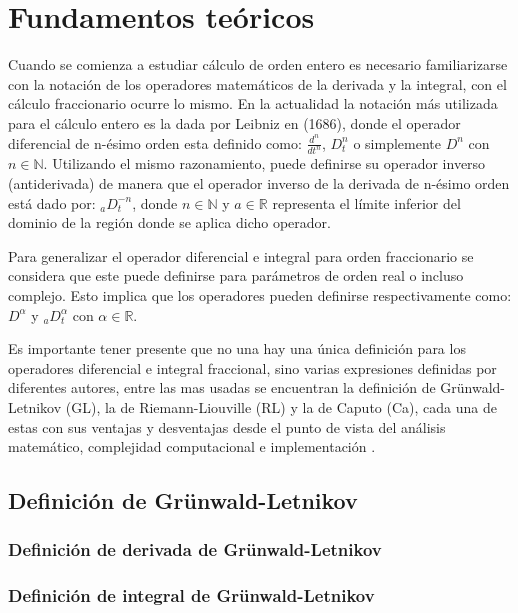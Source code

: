 \chapter{Fundamentos teóricos}		
	Cuando se comienza a estudiar cálculo de orden entero es necesario familiarizarse con la notación de los operadores matemáticos de la derivada y la integral, con el cálculo fraccionario ocurre lo mismo. En la actualidad la notación más utilizada para el cálculo entero es la dada por Leibniz en (1686), donde el operador diferencial de n-ésimo orden esta definido como: $\frac{d^{n}}{dt^{n}}$, $D_{t}^{n}$ o simplemente $D^{n}$ con $n \in \mathbb{N}$. Utilizando el mismo razonamiento, puede definirse su operador inverso (antiderivada) de manera que el operador inverso de la derivada de n-ésimo orden está dado por: $_{a}D^{-n}_{t}$, donde $n \in \mathbb{N}$ y $a \in \mathbb{R}$ representa el límite inferior del dominio de la región donde se aplica dicho operador.
			
	Para generalizar el operador diferencial e integral para orden fraccionario se considera que este puede definirse para parámetros de orden real o incluso complejo. Esto implica que los operadores pueden definirse respectivamente como: $D^{\alpha}$ y $_{a}D^{\alpha}_{t}$ con $ \alpha \in \mathbb{R}$. 
		
	Es importante tener presente que no una hay una única definición para los operadores diferencial e integral fraccional, sino varias expresiones definidas por diferentes autores, entre las mas usadas se encuentran la definición de Grünwald-Letnikov (GL), la de Riemann-Liouville (RL) y la de Caputo (Ca), cada una de estas con sus ventajas y desventajas desde el punto de vista del análisis matemático, complejidad computacional e implementación \cite{Petras2011}.
			
	\section{Definición de Grünwald-Letnikov}
	
		\subsection{Definición de derivada de Grünwald-Letnikov}
			
		\subsection{Definición de integral de Grünwald-Letnikov}

